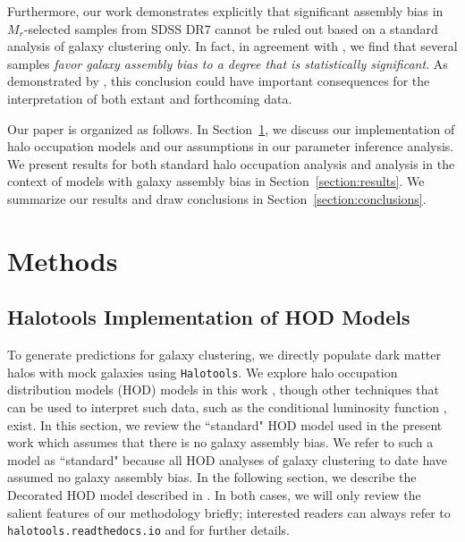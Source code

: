 \documentclass[usenatbib,usegraphicx,letterpaper]{mn2e}
\begin{document}
Furthermore, our work demonstrates explicitly that significant
assembly bias in $M_r$-selected samples from SDSS DR7 cannot be ruled
out based on a standard analysis of galaxy clustering only. In fact,
in agreement with \citet{lehmann_etal15}, we find that several samples
{\em favor galaxy assembly bias to a degree that is statistically
  significant}. As demonstrated by \citet{zentner_etal14}, this
conclusion could have important consequences for the interpretation of
both extant and forthcoming data.

Our paper is organized as follows. In Section~\ref{section:methods},
we discuss our implementation of halo occupation models and our
assumptions in our parameter inference analysis. We present results
for both standard halo occupation analysis and analysis in the context
of models with galaxy assembly bias in
Section~\ref{section:results}. We summarize our results and draw
conclusions in Section~\ref{section:conclusions}.

\section{Methods}
\label{section:methods}

\subsection{Halotools Implementation of HOD Models}
\label{subsection:halotools}

To generate predictions for galaxy clustering, we directly populate dark matter halos with mock galaxies using {\tt Halotools}. 
We explore halo occupation distribution models (HOD) models in this work 
\citep[e.g.][]{seljak00,ma_fry00,scoccimarro01a,berlind02}, though other 
techniques that can be used to interpret such data, such as the conditional luminosity function 
\citep[CLF, e.g.,][]{yang03,vdBosch13}, exist. In this section, we review the ``standard" HOD 
model used in the present work which assumes that there is no galaxy assembly bias. We refer to 
such a model as ``standard" because all HOD analyses of galaxy clustering to date have assumed no 
galaxy assembly bias. In the following section, we describe 
the Decorated HOD model described in \citet{hearin_etal16}. In both cases, we will only 
review the salient features of our methodology briefly; 
interested readers can always refer to {\tt halotools.readthedocs.io} and 
\citet{hearin_etal16} for further details. 
\end{document}
